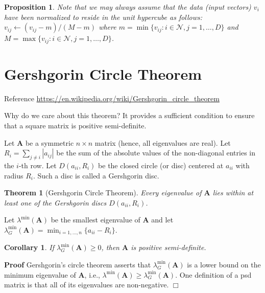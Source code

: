 \documentclass[]{article}
\renewcommand{\v}[1]{\ensuremath{\mathbf{#1}}}
\newcommand{\mc}{\mathcal}
\newtheorem{theorem}{Theorem}
\newtheorem{corollary}{Corollary}
\newtheorem{proposition}{Proposition}
\newcommand{\pf}{\textbf{Proof} \indent}
\newcommand{\qed}{\hfill $\Box$}
\newcommand{\proof}{\pf}
\begin{document}
\begin{proposition}
Note that we may always assume that the data (input vectors) $v_{i}$ have been normalized to reside in the unit hypercube as follows: $v_{ij} \leftarrow (v_{ij} - m)/(M-m)$ where $m=\min\{v_{ij} : i \in \mc{N}, j=1,\dots,D \}$ and $M=\max\{v_{ij} : i \in \mc{N}, j=1,\dots,D \}$.
\end{proposition}

\section{Gershgorin Circle Theorem}

Reference \url{https://en.wikipedia.org/wiki/Gershgorin_circle_theorem}

Why do we care about this theorem? It provides a sufficient condition to ensure that a square matrix is positive semi-definite.

Let $\v{A}$ be a symmetric $n \times n$ matrix (hence, all eigenvalues are real).
Let $R_{i}=\sum _{j\neq {i}} \left|a_{ij}\right|$ be the sum of the absolute values of the non-diagonal entries in the $i$-th row. Let $D(a_{ii},R_{i})$ be the closed circle (or disc) centered at $a_{ii}$ with radius $R_{i}$. Such a disc is called a Gershgorin disc.

\begin{theorem}[Gershgorin Circle Theorem]
Every eigenvalue of $\v{A}$ lies within at least one of the Gershgorin discs $D(a_{ii},R_{i})$.
\end{theorem}

Let $\lambda^{\min}(\v{A})$ be the smallest eigenvalue of $\v{A}$ and let $\lambda_G^{\min}(\v{A}) = \min_{i=1,\ldots,n} \{a_{ii} - R_i\}$.
\begin{corollary}
If $\lambda_G^{\min}(\v{A}) \geq 0$, then $\v{A}$ is positive semi-definite. 
\end{corollary}
\proof Gershgorin's circle theorem asserts that $\lambda_G^{\min}(\v{A})$ is a lower bound on the minimum eigenvalue of $\v{A}$, i.e., $\lambda^{\min}(\v{A}) \geq \lambda_G^{\min}(\v{A})$.  One definition of a psd matrix is that all of its eigenvalues are non-negative. \qed
\end{document}
